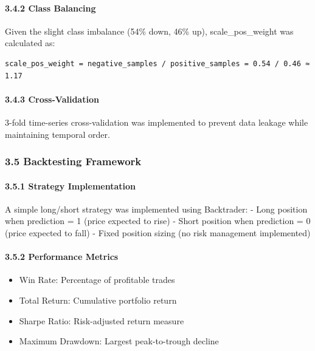 \paragraph{3.4.2 Class Balancing}\label{class-balancing}

Given the slight class imbalance (54\% down, 46\% up),
scale\_pos\_weight was calculated as:

\begin{verbatim}
scale_pos_weight = negative_samples / positive_samples = 0.54 / 0.46 ≈ 1.17
\end{verbatim}

\paragraph{3.4.3 Cross-Validation}\label{cross-validation}

3-fold time-series cross-validation was implemented to prevent data
leakage while maintaining temporal order.

\subsubsection{3.5 Backtesting Framework}\label{backtesting-framework}

\paragraph{3.5.1 Strategy Implementation}\label{strategy-implementation}

A simple long/short strategy was implemented using Backtrader: - Long
position when prediction = 1 (price expected to rise) - Short position
when prediction = 0 (price expected to fall) - Fixed position sizing (no
risk management implemented)

\paragraph{3.5.2 Performance Metrics}\label{performance-metrics}

\begin{itemize}
\tightlist
\item
  Win Rate: Percentage of profitable trades
\item
  Total Return: Cumulative portfolio return
\item
  Sharpe Ratio: Risk-adjusted return measure
\item
  Maximum Drawdown: Largest peak-to-trough decline
\end{itemize}

